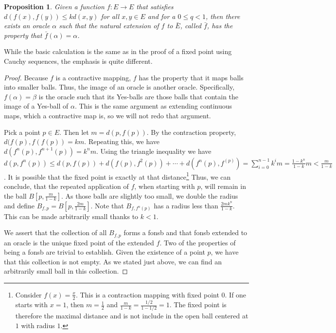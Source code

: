 \documentclass[12pt]{article}
\newtheorem{proposition}{Proposition}[section]
\begin{document}
\begin{proposition}
    Given a function $f:E \to E$ that satisfies $d(f(x), f(y)) \leq k d(x, y)$ for all $x, y \in E$ and for a $0 \leq q < 1$, then there exists an oracle $\alpha$ such that the natural extension of $f$ to $\bar{E}$, called $\bar{f}$, has the property that $\bar{f}(\alpha) = \alpha$.
\end{proposition}

While the basic calculation is the same as in the proof of a fixed point using Cauchy sequences, the emphasis is quite different. 

\begin{proof}
    Because $f$ is a contractive mapping, $f$ has the property that it maps balls into smaller balls. Thus, the image of an oracle is another oracle. Specifically, $f(\alpha) = \beta$ is the oracle such that its Yes-balls are those balls that contain the image of a Yes-ball of $\alpha$. This is the same argument as extending continuous maps, which a contractive map is, so we will not redo that argument. 

    Pick a point $p \in E$. Then let $m = d(p, f(p) )$. By the contraction property, $d(f(p), f(f(p)) = km$. Repeating this, we have $d(f^n(p), f^{n+1}(p) )  = k^n m$. Using the triangle inequality we have $d(p, f^n(p)) \leq d(p, f(p)) + d(f(p), f^2(p)) + \cdots + d(f^n(p), f^(p) ) = \sum_{i=0}^{n-1} k^i m = \frac{1-k^{n}}{1-k} m  < \frac{m}{1-k}$. It is possible that the fixed point is exactly at that distance\footnote{Consider $f(x) = \frac{x}{2}$. This is a contraction mapping with fixed point $0$. If one starts with $x=1$, then $m=\frac{1}{2}$ and $\frac{m}{1-k} = \frac{1/2}{1 - 1/2} = 1$. The fixed point is therefore the maximal distance and is not include in the open ball centered at $1$ with radius $1$.} Thus, we can conclude, that the repeated application of $f$, when starting with $p$, will remain in the ball $B[p, \frac{m}{1-k}]$. As those balls are slightly too small, we double the radius and define $B_{f,p} = B[p, \frac{2m}{1-k}]$. Note that $B_{f,f^n(p)}$ has a radius less than $\frac{2 m k^n}{1-k}$. This can be made arbitrarily small thanks to $k < 1$.
    
    We assert that the collection of all $B_{f,p}$ forms a fonsb and that fonsb extended to an oracle is the unique fixed point of the extended $f$. Two of the properties of being a fonsb are trivial to establish.  Given the existence of a point $p$, we have that this collection is not empty. As we stated just above, we can find an arbitrarily small ball in this collection.


\end{proof}
\end{document}
